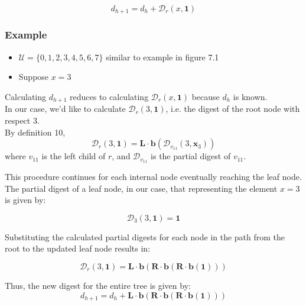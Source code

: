 \documentclass[11pt, letterpaper, oneside]{article}
\begin{document}
\begin{equation}
d_{h+1} = d_{h} + \mathcal{D}_{r}(x, \textbf{1})
\end{equation}

\subsubsection{Example}

\begin{itemize}
\item $\mathcal{U} = \{ 0, 1, 2, 3, 4, 5, 6, 7\}$ similar to example in figure 7.1
\item Suppose $x = 3$
\end{itemize}

Calculating $d_{h + 1}$ reduces to calculating 	$ \mathcal{D}_{r}(x, \textbf{1})$ because $d_{h}$ is known.  \\

In our case, we'd like to calculate $\mathcal{D}_{r}(3, \textbf{1})$, i.e. the digest of the root node with respect 3. \\

By definition 10,
\begin{equation}
\mathcal{D}_{r}(3, \textbf{1}) = \textbf{L} \cdot \textbf{b}(\mathcal{D}_{v_{11}}(3, \textbf{x}_{3}))
\end{equation}
where $v_{11}$ is the left child of $r$, and $\mathcal{D}_{v_{11}}$ is the partial digest of $v_{11}$.

This procedure continues for each internal node eventually reaching the leaf node. The partial digest of a leaf node, in our case, that representing the element $x = 3$ is given by:

\begin{equation}
\mathcal{D}_{3}(3, \textbf{1}) = \textbf{1}
\end{equation}

Substituting the calculated partial digests for each node in the path from the root to the updated leaf node results in:

\begin{equation}
\mathcal{D}_{r}(3, \textbf{1}) = \textbf{L} \cdot \textbf{b} ( \textbf{R} \cdot \textbf{b} ( \textbf{R} \cdot \textbf{b} ( \textbf{1} ) )  )
\end{equation}

Thus, the new digest for the entire tree is given by:
\begin{equation}
d_{h+1} = d_{h} + \textbf{L} \cdot \textbf{b} ( \textbf{R} \cdot \textbf{b} ( \textbf{R} \cdot \textbf{b} ( \textbf{1} ) )  )
\end{equation}
\end{document}
